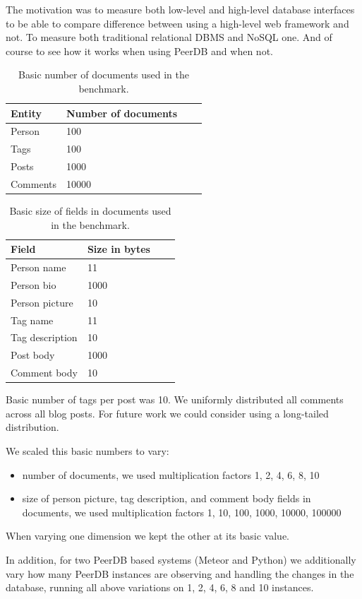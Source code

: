 The motivation was to measure both low-level and high-level database interfaces to be able to compare difference between using a high-level web framework and not. To measure both traditional relational DBMS and NoSQL one. And of course to see how it works when using PeerDB and when not.

\begin{table}
  \small
  \begin{center}
  \begin{tabular}{|l|l|l|l|}
    \hline
    Entity & Number of documents\\
    \hline
    Person & 100 \\
    Tags & 100 \\ 
    Posts & 1000 \\ 
    Comments & 10000 \\ 
    \hline

  \end{tabular}
  \end{center}
  \caption{Basic number of documents used in the benchmark.}
  \label{numbers}
\end{table}

\begin{table}
  \small
  \begin{center}
  \begin{tabular}{|l|l|l|l|}
    \hline
    Field & Size in bytes\\
    \hline
    Person name & 11 \\
    Person bio & 1000 \\ 
    Person picture & 10 \\ 
    Tag name & 11 \\ 
    Tag description & 10 \\
    Post body & 1000 \\
    Comment body & 10 \\
    \hline

  \end{tabular}
  \end{center}
  \caption{Basic size of fields in documents used in the benchmark.}
  \label{sizes}
\end{table}

Basic number of tags per post was 10.
We uniformly distributed all comments across all blog posts. For future work we could consider using a long-tailed distribution.

We scaled this basic numbers to vary:
\begin{itemize}
\item number of documents, we used multiplication factors 1, 2, 4, 6, 8, 10
\item size of person picture, tag description, and comment body fields in documents, we used multiplication factors 1, 10, 100, 1000, 10000, 100000
\end{itemize}

When varying one dimension we kept the other at its basic value.

In addition, for two PeerDB based systems (Meteor and Python) we additionally vary how many PeerDB instances are observing and handling the changes in the database, running all above variations on 1, 2, 4, 6, 8 and 10 instances.
